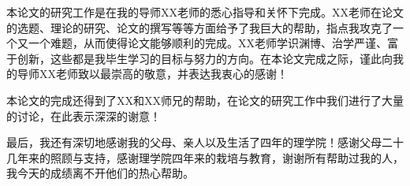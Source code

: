 本论文的研究工作是在我的导师XX老师的悉心指导和关怀下完成。XX老师在论文的选题、理论的研究、论文的撰写等等方面给予了我巨大的帮助，指点我攻克了一个又一个难题，从而使得论文能够顺利的完成。XX老师学识渊博、治学严谨、富于创新，这些都是我毕生学习的目标与努力的方向。在本论文完成之际，谨此向我的导师XX老师致以最崇高的敬意，并表达我衷心的感谢！

本论文的完成还得到了XX和XX师兄的帮助，在论文的研究工作中我们进行了大量的讨论，在此表示深深的谢意！

最后，我还有深切地感谢我的父母、亲人以及生活了四年的理学院！感谢父母二十几年来的照顾与支持，感谢理学院四年来的栽培与教育，谢谢所有帮助过我的人，我今天的成绩离不开他们的热心帮助。